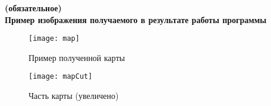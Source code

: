 \setcounter{section}{3}
\setcounter{figure}{0}
\begin{center}
	\vspace{-1em}
	\textbf{(обязательное)}\\	
	\textbf{Пример изображения получаемого в результате работы программы}
\end{center}

\begin{figure}[h]
	\centering   
	\texttt{[image: map]} 
	\caption{Пример полученной карты}
	\label{fig:map}
\end{figure}

\begin{figure}[h]
	\centering   
	\texttt{[image: mapCut]} 
	\caption{Часть карты (увеличено)}
	\label{fig:mapCut}
\end{figure}